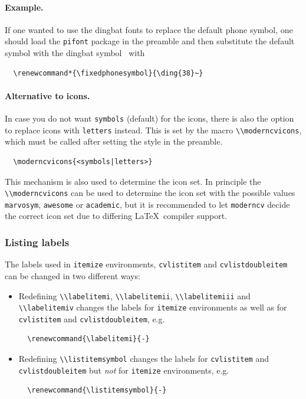 \documentclass[a4paper, 11pt]{article}
\newcommand{\code}[1]{\lstinline!#1!}
\newcommand{\moderncv}{\code{moderncv}}
\newcommand{\Latex}{\LaTeX~}
\begin{document}
\paragraph{Example.}
If one wanted to use the dingbat fonts to replace the default phone symbol, one should load the \code{pifont} package in the preamble and then substitute the default symbol with the dingbat symbol \ with
\begin{lstlisting}
  \renewcommand*{\fixedphonesymbol}{\ding{38}~}
\end{lstlisting}

\paragraph{Alternative to icons.}
In case you do not want \texttt{symbols} (default) for the icons, there is also the option to replace icons with \texttt{letters} instead. This is set by the macro \code{\\moderncvicons}, which must be called after setting the style in the preamble.
\begin{lstlisting}
  \moderncvicons{<symbols|letters>}
\end{lstlisting}
This mechanism is also used to determine the icon set. In principle the \code{\\moderncvicons} can be used to determine the icon set with the possible values \texttt{marvosym}, \texttt{awesome} or \texttt{academic}, but it is recommended to let {\moderncv} decide the correct icon set due to differing \Latex compiler support.

\subsubsection{Listing labels}
The labels used in \code{itemize} environments, \code{cvlistitem} and \code{cvlistdoubleitem} can be changed in two different ways:

\begin{itemize}
  \item Redefining \code{\\labelitemi}, \code{\\labelitemii}, \code{\\labelitemiii} and \code{\\labelitemiv} changes the labels for \code{itemize} environments as well as for \code{cvlistitem} and \code{cvlistdoubleitem}, e.g.
  \begin{lstlisting}
  \renewcommand{\labelitemi}{-}
  \end{lstlisting}
  \item Redefining \code{\\listitemsymbol} changes the labels for \code{cvlistitem} and \code{cvlistdoubleitem} but \emph{not} for \code{itemize} environments, e.g.
  \begin{lstlisting}
  \renewcommand{\listitemsymbol}{-}
\end{lstlisting}
\end{itemize}
\end{document}
